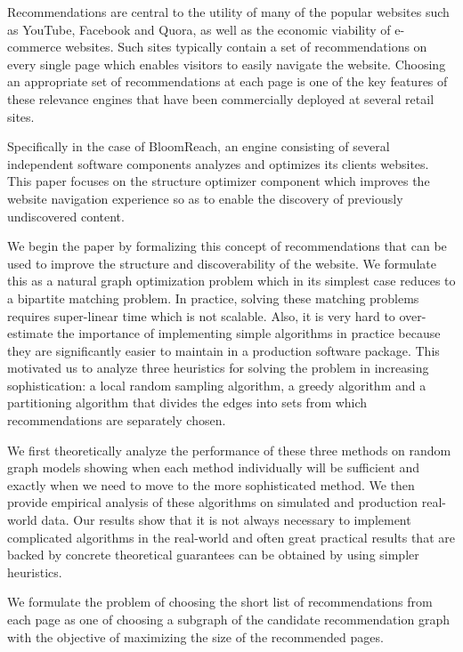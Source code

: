 \abstract

Recommendations are central to the utility of many of the popular websites such as YouTube, 
Facebook and Quora, as well as the economic viability of e-commerce websites. 
Such sites typically contain a set of recommendations on every single
page which enables visitors to easily navigate the website. Choosing
an appropriate set of recommendations at each page is one of the key
features of these relevance engines that have been commercially deployed at several retail sites.

Specifically in the case of BloomReach, an engine consisting of several independent 
software components analyzes and optimizes its clients websites.
This paper focuses on the structure optimizer component which
improves the website navigation experience so as to enable the discovery of previously 
undiscovered content. 

We begin the paper by formalizing this concept of recommendations that can be used to improve
the structure and discoverability of the website. We formulate this as a natural graph optimization 
problem which in its simplest case reduces to a bipartite matching problem. In practice, solving these 
matching problems requires super-linear time which is not scalable. Also, it is very hard to 
over-estimate the importance of implementing simple algorithms in
practice because they are 
significantly easier to maintain in a production software package. This motivated us to analyze three heuristics
for solving the problem in increasing sophistication: a local random sampling algorithm, 
a greedy algorithm and a partitioning algorithm that divides the edges into sets from which recommendations 
are separately chosen.

We first theoretically analyze the performance of these three methods
on random graph models showing when each method individually will be sufficient and exactly 
when we need to move to the more sophisticated method. We then provide empirical analysis
of these algorithms on simulated and production real-world data. Our
results show that it is not always necessary to implement complicated
algorithms in the real-world and often great practical results that
are backed by concrete theoretical guarantees can be obtained by using simpler heuristics.

\iffalse 

We formulate the problem of choosing the short list of recommendations from each page as one of choosing a subgraph of the candidate recommendation graph with the objective of maximizing the size of the recommended pages.

